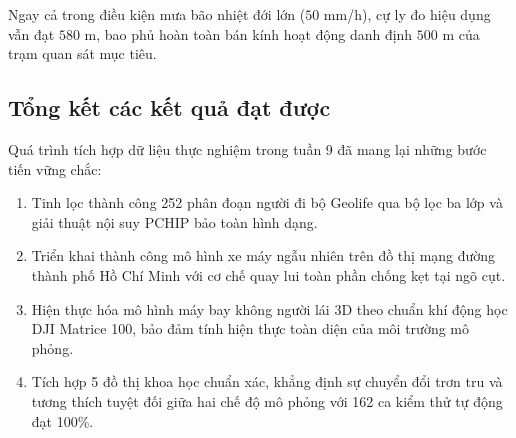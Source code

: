 \begin{table}[H]
\centering
\caption{Đo đạc suy hao quang học và độ suy giảm cự ly đo hiệu dụng dưới các điều kiện thời tiết}
\label{tab:atmospheric-optical-attenuation-table}
\end{table}

Ngay cả trong điều kiện mưa bão nhiệt đới lớn ($50$ mm/h), cự ly đo hiệu dụng vẫn đạt $580$ m, bao phủ hoàn toàn bán kính hoạt động danh định $500$ m của trạm quan sát mục tiêu.

\subsection{Tổng kết các kết quả đạt được}

\hspace{0.5cm} Quá trình tích hợp dữ liệu thực nghiệm trong tuần 9 đã mang lại những bước tiến vững chắc:
\begin{enumerate}
    \item Tinh lọc thành công 252 phân đoạn người đi bộ Geolife qua bộ lọc ba lớp và giải thuật nội suy PCHIP bảo toàn hình dạng.
    \item Triển khai thành công mô hình xe máy ngẫu nhiên trên đồ thị mạng đường thành phố Hồ Chí Minh với cơ chế quay lui toàn phần chống kẹt tại ngõ cụt.
    \item Hiện thực hóa mô hình máy bay không người lái 3D theo chuẩn khí động học DJI Matrice 100, bảo đảm tính hiện thực toàn diện của môi trường mô phỏng.
    \item Tích hợp 5 đồ thị khoa học chuẩn xác, khẳng định sự chuyển đổi trơn tru và tương thích tuyệt đối giữa hai chế độ mô phỏng với 162 ca kiểm thử tự động đạt 100\%.
\end{enumerate}
